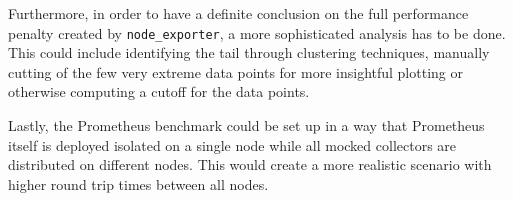 Furthermore, in order to have a definite conclusion on the full performance penalty created by \texttt{node\_exporter}, a more sophisticated analysis has to be done. This could include identifying the tail through clustering techniques, manually cutting of the few very extreme data points for more insightful plotting or otherwise computing a cutoff for the data points.

Lastly, the Prometheus benchmark could be set up in a way that Prometheus itself is deployed isolated on a single node while all mocked collectors are distributed on different nodes. This would create a more realistic scenario with higher round trip times between all nodes.
